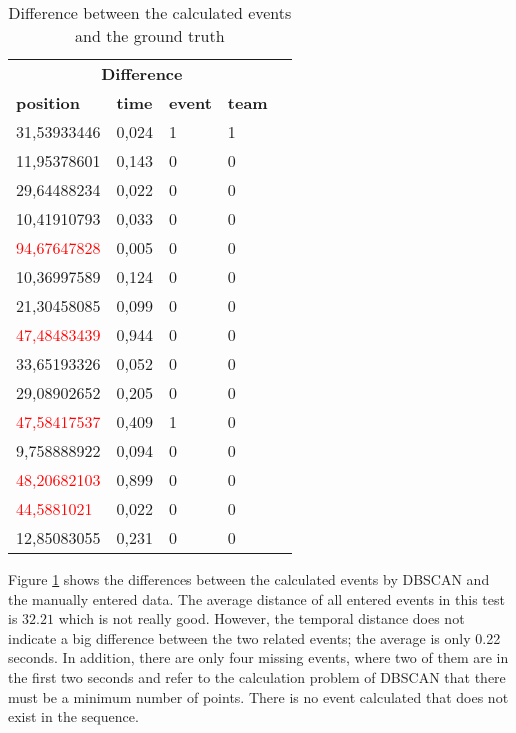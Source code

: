 \begin{table}[H]
    \begin{center}
		\begin{tabular}{|l|l|l|l|l}
			\hline
            \multicolumn{4}{|c|}{\large \textbf{Difference}} \\
			\hhline{====}
			\textbf{position} & \textbf{time} & \textbf{event} & \textbf{team} \\
			\hline
			31,53933446 & 0,024 & 1 & 1 \\
			\hline
            11,95378601 & 0,143 & 0 & 0 \\
			\hline
            29,64488234 & 0,022 & 0 & 0 \\
			\hline
            10,41910793 & 0,033 & 0 & 0 \\
			\hline
            \textcolor{red}{94,67647828} & 0,005 & 0 & 0 \\
			\hline
            10,36997589 & 0,124 & 0 & 0 \\
			\hline
            21,30458085 & 0,099 & 0 & 0 \\
    			\hline
            \textcolor{red}{47,48483439} & 0,944 & 0 & 0 \\
			\hline
            33,65193326 & 0,052 & 0 & 0 \\
			\hline
            29,08902652 & 0,205 & 0 & 0 \\
			\hline
            \textcolor{red}{47,58417537} & 0,409 & 1 & 0 \\
			\hline
            9,758888922 & 0,094 & 0 & 0 \\
			\hline
            \textcolor{red}{48,20682103} & 0,899 & 0 & 0 \\
			\hline
            \textcolor{red}{44,5881021} & 0,022 & 0 & 0 \\
			\hline
            12,85083055 & 0,231 & 0 & 0 \\
			\hline
		\end{tabular}
    \end{center}
    \caption{Difference between the calculated events and the ground truth}
    \label{img:diffGT:third}
\end{table}

Figure \ref{img:diffGT:third} shows the differences between the calculated events by DBSCAN and the manually entered data.
The average distance of all entered events in this test is $32.21$ which is not really  good. However, the temporal distance does not indicate a big difference between the two related events; the average is only 0.22 seconds.
In addition, there are only four missing events, where two of them are in the first two seconds and refer to the calculation problem of DBSCAN that there must be a minimum number of points.
There is no event calculated that does not exist in the sequence.



